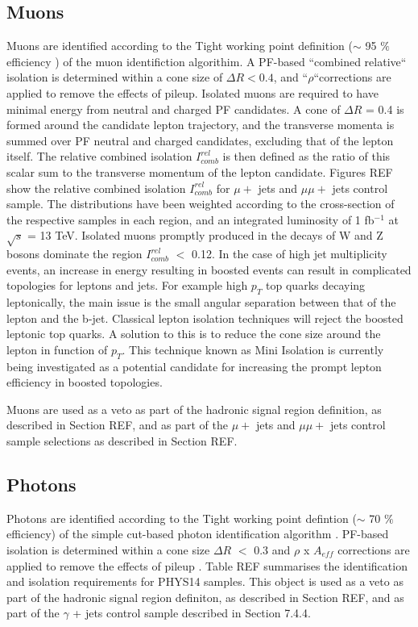 \subsection{Muons}
\label{sec:muon-id}
Muons are identified according to the Tight working point definition ($\sim$ 95 $\%$ efficiency ) of the muon identifiction algorithim. A PF-based ``combined relative`` isolation is determined within a cone size of $\Delta R < 0.4 $, and ``$\rho$``corrections are applied to remove the effects of pileup. Isolated muons are required to have minimal energy from neutral and charged PF candidates. A cone of $\Delta R$ = 0.4 is formed around the candidate lepton trajectory, and the transverse momenta is summed over PF neutral and charged candidates, excluding that of the lepton itself. The relative combined isolation $I^{rel}_{comb}$ is then defined as the ratio of this scalar sum to the transverse momentum of the lepton candidate. 
Figures REF show the relative combined isolation $I^{rel}_{comb}$ for $\mu +$ jets and $\mu\mu +$ jets control sample. The distributions have been weighted according to the cross-section of the respective samples in each region, and an integrated luminosity of 1 fb$^{-1}$ at $\sqrt{s}$ = 13 TeV. Isolated muons promptly produced in the decays of W and Z bosons dominate the region $I^{rel}_{comb}$ $<$ 0.12.
In the case of high jet multiplicity events, an increase in energy resulting in boosted events can result in complicated topologies for leptons and jets. For example high $p_{T}$ top quarks decaying leptonically, the main issue is the small angular separation between that of the lepton and the b-jet. Classical lepton isolation techniques will reject the boosted leptonic top quarks. A solution to this is to reduce the cone size around the lepton in function of $p_{T}$. This technique known as Mini Isolation is currently being investigated as a potential candidate for increasing the prompt lepton efficiency in boosted topologies.  

Muons are used as a veto as part of the hadronic signal region definition, as described in Section REF, and as part of the $\mu +$ jets and $\mu\mu +$ jets control sample selections as described in Section REF.


\subsection{Photons}
\label{sec:photon-id}
Photons are identified according to the Tight working point defintion ($\sim$ 70 $\%$ efficiency) of the simple cut-based photon identification algorithm \cite{photon-id}. PF-based isolation is determined within a cone size $\Delta R$ $<$ 0.3 and $\rho$ x $A_{eff}$ corrections are applied to remove the effects of pileup \cite{pf-photon}. Table REF summarises the identification and isolation requirements for PHYS14 samples. 
This object is used as a veto as part of the hadronic signal region definiton, as described in Section REF, and as part of the $\gamma$ + jets control sample described in Section 7.4.4.


